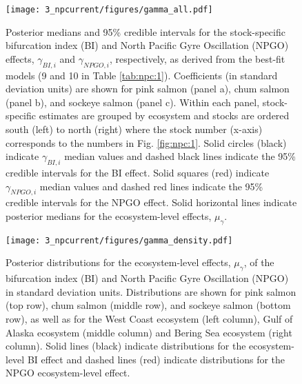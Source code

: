 \begin{figure}[htbp]
  \centering \texttt{[image: 3\_npcurrent/figures/gamma\_all.pdf]}
  \caption[Posterior medians and 95\% credible intervals for the stock-specific
           bifurcation index and North Pacific Gyre Oscillation
           effects]{Posterior medians and 95\% credible intervals for the
           stock-specific bifurcation index (BI) and North Pacific Gyre
           Oscillation (NPGO) effects, \(\gamma_{BI,i}\) and
           \(\gamma_{NPGO,i}\), respectively, as derived from the best-fit
           models (9 and 10 in Table \ref{tab:npc:1}). Coefficients (in standard
           deviation units) are shown for pink salmon (panel a), chum salmon
           (panel b), and sockeye salmon (panel c). Within each panel,
           stock-specific estimates are grouped by ecosystem and stocks are
           ordered south (left) to north (right) where the stock number (x-axis)
           corresponds to the numbers in Fig. \ref{fig:npc:1}. Solid circles
           (black) indicate \(\gamma_{BI,i}\) median values and dashed black
           lines indicate the 95\% credible intervals for the BI effect. Solid
           squares (red) indicate \(\gamma_{NPGO,i}\) median values and dashed
           red lines indicate the 95\% credible intervals for the NPGO effect.
           Solid horizontal lines indicate posterior medians for the
           ecosystem-level effects, \(\mu_{\gamma}\).}
  \label{fig:npc:3}
\end{figure}

\begin{figure}[htbp]
  \centering \texttt{[image: 3\_npcurrent/figures/gamma\_density.pdf]}
  \caption[Posterior distributions for the ecosystem-level effects of the
           bifurcation index and North Pacific Gyre Oscillation]{Posterior
           distributions for the ecosystem-level effects, \(\mu_{\gamma}\), of
           the bifurcation index (BI) and North Pacific Gyre Oscillation (NPGO)
           in standard deviation units. Distributions are shown for pink salmon
           (top row), chum salmon (middle row), and sockeye salmon (bottom row),
           as well as for the West Coast ecosystem (left column), Gulf of Alaska
           ecosystem (middle column) and Bering Sea ecosystem (right column).
           Solid lines (black) indicate distributions for the ecosystem-level BI
           effect and dashed lines (red) indicate distributions for the NPGO
           ecosystem-level effect.}
  \label{fig:npc:4}
\end{figure}

